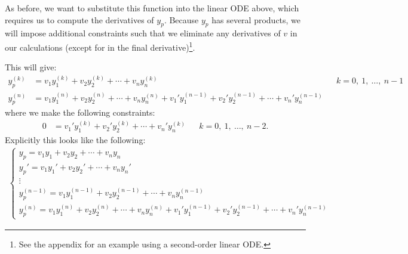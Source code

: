 \documentclass{article}
\begin{document}
As before, we want to substitute this function into the linear ODE above, which requires us
to compute the derivatives of \(y_p\). Because \(y_p\) has several products, we will impose
additional constraints such that we eliminate any derivatives of \(v\) in our calculations (except for in the final derivative)\footnote{See the appendix for an example using a second-order linear ODE.}.

This will give:
\begin{align*}
    y_p^{\left( k \right)} & = v_1 y_1^{\left( k \right)} + v_2 y_2^{\left( k \right)} + \cdots + v_n y_n^{\left( k \right)}                                                                                                          &  & k = 0,\: 1,\: \dots,\: n - 1 \\
    y_p^{\left( n \right)} & = v_1 y_1^{\left( n \right)} + v_2 y_2^{\left( n \right)} + \cdots + v_n y_n^{\left( n \right)} + v_1' y_1^{\left( n-1 \right)} + v_2' y_2^{\left( n-1 \right)} + \cdots + v_n' y_n^{\left( n-1 \right)}
\end{align*}
where we make the following constraints:
\begin{align*}
    0 & = v_1' y_1^{\left( k \right)} + v_2' y_2^{\left( k \right)} + \cdots + v_n' y_n^{\left( k \right)} &  & k = 0,\: 1,\: \dots,\: n - 2.
\end{align*}
Explicitly this looks like the following:
\begin{align*}
    \begin{cases}
        y_p                        = v_1 y_1 + v_2 y_2 + \cdots + v_n y_n                                                                      \\
        y_p'                       = v_1 y_1' + v_2 y_2' + \cdots + v_n y_n'                                                                   \\
        \vdots                                                                                                                                 \\
        y_p^{\left( n - 1 \right)} = v_1 y_1^{\left( n - 1 \right)} + v_2 y_2^{\left( n - 1 \right)} + \cdots + v_n y_n^{\left( n - 1 \right)} \\
        y_p^{\left( n \right)} = v_1 y_1^{\left( n \right)} + v_2 y_2^{\left( n \right)} + \cdots + v_n y_n^{\left( n \right)} + v_1' y_1^{\left( n-1 \right)} + v_2' y_2^{\left( n-1 \right)} + \cdots + v_n' y_n^{\left( n-1 \right)}
    \end{cases}
\end{align*}
\end{document}
